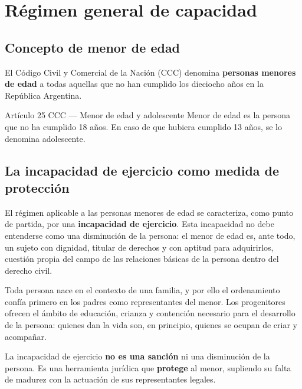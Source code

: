 \documentclass[12pt,oneside]{book}
\begin{document}
\chapter{Régimen general de capacidad}

\section{Concepto de menor de edad}

El Código Civil y Comercial de la Nación (CCC) denomina \textbf{personas menores de edad} a todas aquellas que no han cumplido los dieciocho años en la República Argentina.

\begin{definition}{Artículo 25 CCC — Menor de edad y adolescente}
Menor de edad es la persona que no ha cumplido 18 años. En caso de que hubiera cumplido 13 años, se lo denomina adolescente.
\end{definition}

\section{La incapacidad de ejercicio como medida de protección}

El régimen aplicable a las personas menores de edad se caracteriza, como punto de partida, por una \textbf{incapacidad de ejercicio}. Esta incapacidad no debe entenderse como una disminución de la persona: el menor de edad es, ante todo, un sujeto con dignidad, titular de derechos y con aptitud para adquirirlos, cuestión propia del campo de las relaciones básicas de la persona dentro del derecho civil.

Toda persona nace en el contexto de una familia, y por ello el ordenamiento confía primero en los padres como representantes del menor. Los progenitores ofrecen el ámbito de educación, crianza y contención necesario para el desarrollo de la persona: quienes dan la vida son, en principio, quienes se ocupan de criar y acompañar.

\begin{important}
La incapacidad de ejercicio \textbf{no es una sanción} ni una disminución de la persona. Es una herramienta jurídica que \textbf{protege} al menor, supliendo su falta de madurez con la actuación de sus representantes legales.
\end{important}
\end{document}
